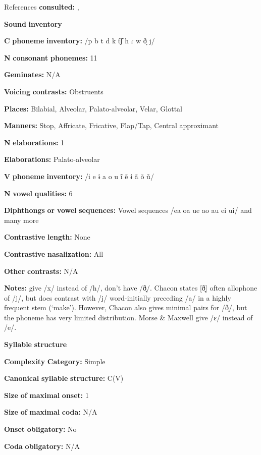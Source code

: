 References \textbf{consulted:} \citet{Chacon2012}, \citet{MorseMaxwell1999}

\textbf{Sound} \textbf{inventory}

\textbf{C} \textbf{phoneme} \textbf{inventory:} /p b t d k t͡ʃ h ɾ w ð̞ j/

\textbf{N} \textbf{consonant} \textbf{phonemes:} 11

\textbf{Geminates:} N/A

\textbf{Voicing} \textbf{contrasts:} Obstruents

\textbf{Places:} Bilabial, Alveolar, Palato-alveolar, Velar, Glottal

\textbf{Manners:} Stop, Affricate, Fricative, Flap/Tap, Central approximant

\textbf{N} \textbf{elaborations:} 1

\textbf{Elaborations:} Palato-alveolar

\textbf{V} \textbf{phoneme} \textbf{inventory:} /i e ɨ a o u ĩ ẽ ɨ ã õ ũ/

\textbf{N} \textbf{vowel} \textbf{qualities:} 6

\textbf{Diphthongs} \textbf{or} \textbf{vowel} \textbf{sequences:} Vowel sequences /ea oa ue ao au ei ui/ and many more

\textbf{Contrastive} \textbf{length:} None

\textbf{Contrastive} \textbf{nasalization:} All

\textbf{Other} \textbf{contrasts:} N/A

\textbf{Notes:} \citet{MorseMaxwell1999} give /x/ instead of /h/, don’t have /ð̞/. Chacon states [ð̞] often allophone of /j/, but does contrast with /j/ word-initially preceding /a/ in a highly frequent stem (‘make’). However, Chacon also gives minimal pairs for /ð̞/, but the phoneme has very limited distribution. Morse \& Maxwell give /ɛ/ instead of /e/.

\textbf{Syllable} \textbf{structure}

\textbf{Complexity} \textbf{Category:} Simple

\textbf{Canonical} \textbf{syllable} \textbf{structure:} C(V) \citep[163-7]{Chacon2012}

\textbf{Size} \textbf{of} \textbf{maximal} \textbf{onset:} 1

\textbf{Size} \textbf{of} \textbf{maximal} \textbf{coda:} N/A

\textbf{Onset} \textbf{obligatory:} No

\textbf{Coda} \textbf{obligatory:} N/A

